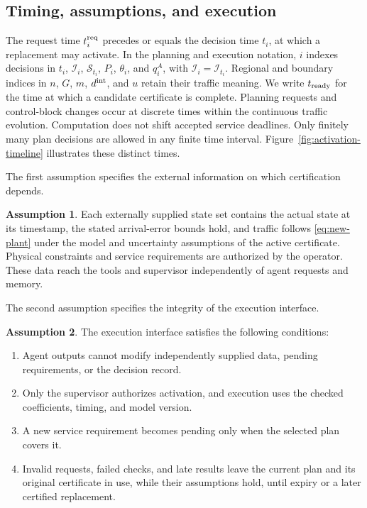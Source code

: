\documentclass[preprint,12pt]{elsarticle}
\theoremstyle{definition}
\newtheorem{assumption}{Assumption}
\theoremstyle{plain}
\theoremstyle{definition}
\theoremstyle{plain}
\begin{document}
\subsection{Timing, assumptions, and execution}
\label{sec:execution-interface}

The request time $t_i^{\rm req}$ precedes or equals the decision time
$t_i$, at which a replacement may activate. In the planning and execution
notation, $i$ indexes decisions in $t_i$, $\mathcal I_i$,
$\mathcal S_{t_i}$, $P_i$, $\theta_i$, and $q_i^A$, with
$\mathcal I_i=\mathcal I_{t_i}$. Regional and boundary
indices in $n$, $G$, $m$, $d^{\rm int}$, and $u$ retain their traffic
meaning. We write $t_{\rm ready}$ for the time at which a candidate
certificate is complete. Planning requests and control-block changes
occur at discrete times within the continuous traffic evolution.
Computation does not shift accepted service deadlines. Only finitely many
plan decisions are allowed in any finite time interval.
Figure~\ref{fig:activation-timeline} illustrates these distinct times.

The first assumption specifies the external information on which
certification depends.

\begin{assumption}
\label{ass:trusted-inputs}
Each externally supplied state set contains the actual state at its
timestamp, the stated arrival-error bounds hold, and traffic follows
\eqref{eq:new-plant} under the model and uncertainty assumptions of the
active certificate. Physical constraints and service requirements are
authorized by the operator. These data reach the tools and supervisor
independently of agent requests and memory.
\end{assumption}

The second assumption specifies the integrity of the execution interface.

\begin{assumption}
\label{ass:supervisory-separation}
The execution interface satisfies the following conditions:
\begin{enumerate}
\renewcommand{\labelenumi}{(\alph{enumi})}
\item Agent outputs cannot modify independently supplied data, pending
requirements, or the decision record.
\item Only the supervisor authorizes activation, and execution uses the
checked coefficients, timing, and model version.
\item A new service requirement becomes pending only when the selected
plan covers it.
\item Invalid requests, failed checks, and late results leave the current
plan and its original certificate in use, while their assumptions hold,
until expiry or a later certified replacement.
\end{enumerate}
\end{assumption}
\end{document}
